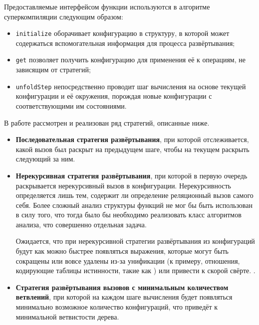 Предоставляемые интерфейсом функции используются в алгоритме суперкомпиляции следующим образом:
\begin{itemize}
\item \lstinline{initialize} оборачивает конфигурацию в структуру, в которой может содержаться
      вспомогательная информация для процесса развёртывания;
\item \lstinline{get} позволяет получить конфигурацию для применения её к операциям, не зависящим
      от стратегий;
\item \lstinline{unfoldStep} непосредственно проводит шаг вычисления на основе текущей конфигурации
      и её окружения, порождая новые конфигурации с соответствующими им состояниями.
\end{itemize}

В работе рассмотрен и реализован ряд стратегий, описанные ниже.

\begin{itemize}
\item {\bf Последовательная стратегия развёртывания}, при которой отслеживается,
      какой вызов был раскрыт на предыдущем шаге, чтобы на текущем
      раскрыть следующий за ним.
\item {\bf Нерекурсивная стратегия развёртывания}, при которой в первую очередь
      раскрывается нерекурсивный вызов в конфигурации. Нерекурсивность определяется
      лишь тем, содержит ли определение реляционный вызов самого себя. Более сложный
      анализ структуры функций не мог бы быть использован в силу того, что тогда
      было бы необходимо реализовать класс алгоритмов анализа, что совершенно отдельная задача.

      Ожидается, что при нерекурсивной стратегии развёртывания из конфигураций
      будут как можно быстрее появляться выражения, которые могут быть сокращены
      или вовсе удалены из-за унификации (к примеру, отношения, кодирующие
      таблицы истинности, такие как ) или привести к скорой свёрте.
      .

\item {\bf Стратегия развёртывания вызовов с минимальным количеством ветвлений},
      при которой на каждом шаге вычисления будет появляться минимально возможное количество
      конфигураций, что приведёт к минимальной ветвистости дерева.
\end{itemize}


